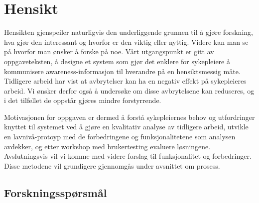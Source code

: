 \section{Hensikt}
\label{chp: hensikt}

Hensikten gjenspeiler naturligvis den underliggende grunnen til å gjøre forskning, hva gjør den interessant og hvorfor er den viktig eller nyttig. Videre kan man se på hvorfor man ønsker å forske på noe. Vårt utgangspunkt er gitt av oppgaveteksten, å designe et system som gjør det enklere for sykepleiere å kommunisere awareness-informasjon til hverandre på en hensiktsmessig måte. Tidligere arbeid har vist at avbrytelser kan ha en negativ effekt på sykepleieres arbeid. Vi ønsker derfor også å undersøke om disse avbrytelsene kan reduseres, og i det tilfellet de oppstår gjøres mindre forstyrrende. 

\noindent
Motivasjonen for oppgaven er dermed å forstå sykepleiernes behov og utfordringer knyttet til systemet ved å gjøre en kvalitativ analyse av tidligere arbeid, utvikle en lavnivå-protoyp med de forbedringene og funksjonalitetene som analysen avdekker, og etter workshop med brukertesting evaluere løsningene. Avslutningsvis vil vi komme med videre forslag til funksjonalitet og forbedringer. Disse metodene vil grundigere gjennomgås under avsnittet om prosess. 

\subsection{Forskningsspørsmål}